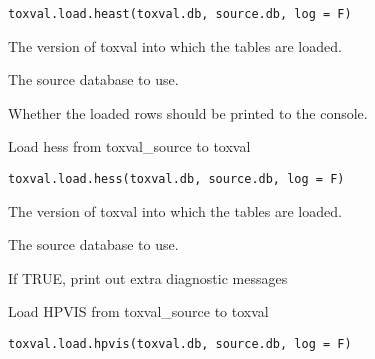 \documentclass[letterpaper]{book}
\begin{document}
%
\begin{Usage}
\begin{verbatim}
toxval.load.heast(toxval.db, source.db, log = F)
\end{verbatim}
\end{Usage}
%
\begin{Arguments}
\begin{ldescription}
\item[\code{toxval.db}] The version of toxval into which the tables are loaded.

\item[\code{source.db}] The source database to use.

\item[\code{verbose}] Whether the loaded rows should be printed to the console.
\end{ldescription}
\end{Arguments}
%
\begin{Description}\relax
Load hess from toxval\_source to toxval
\end{Description}
%
\begin{Usage}
\begin{verbatim}
toxval.load.hess(toxval.db, source.db, log = F)
\end{verbatim}
\end{Usage}
%
\begin{Arguments}
\begin{ldescription}
\item[\code{toxval.db}] The version of toxval into which the tables are loaded.

\item[\code{source.db}] The source database to use.

\item[\code{verbose}] If TRUE, print out extra diagnostic messages
\end{ldescription}
\end{Arguments}
%
\begin{Description}\relax
Load HPVIS from toxval\_source to toxval
\end{Description}
%
\begin{Usage}
\begin{verbatim}
toxval.load.hpvis(toxval.db, source.db, log = F)
\end{verbatim}
\end{Usage}
\end{document}
